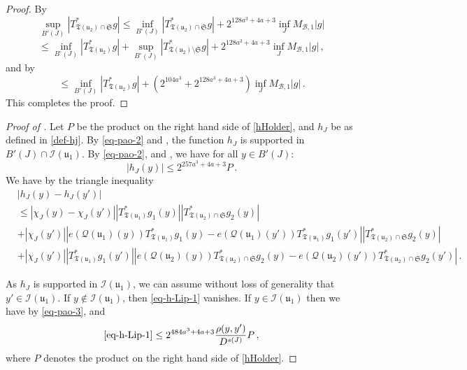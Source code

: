 \documentclass[10pt,a4paper]{article}
\theoremstyle{plain}
\theoremstyle{definition}
\numberwithin{equation}{subsection}
\newcommand{\fu}{{\mathfrak u}}
\newcommand{\fT}{{\mathfrak T}}
\newcommand{\scI}{{\mathcal{I}}} %
\newcommand{\fcc}{{\mathcal{Q}}}
\newcommand{\proves}[1]{}
\newcommand{\leanok}{}
\begin{document}
    \begin{proof}
        \leanok
        By 
        $$
            \sup_{B'(J)} |T^*_{\fT(\fu_2) \cap \mathfrak{S}} g| \le \inf_{B^\circ{}(J)} |T_{\fT(\fu_2) \cap \mathfrak{S}}^* g| + 2^{128a^3+4a+3} \inf_{J} M_{\mathcal{B}, 1} |g|
        $$
        $$
            \le \inf_{B^\circ{}(J)} |T_{\fT(\fu_2)}^* g| + \sup_{B^\circ{}(J)} |T_{\fT(\fu_2) \setminus \mathfrak{S}}^* g| + 2^{128a^3+4a+3} \inf_{J} M_{\mathcal{B}, 1} |g|\,,
        $$
        and by 
        $$
            \le \inf_{B^\circ{}(J)} |T_{\fT(\fu_2)}^* g| + (2^{104a^3} + 2^{128a^3+4a+3}) \inf_{J} M_{\mathcal{B}, 1} |g|\,.
        $$
        This completes the proof.
    \end{proof}

    \begin{proof}[Proof of ]
        \leanok
        \proves{Holder-correlation-tree}
        Let $P$ be the product on the right hand side of \eqref{hHolder}, and $h_J$ be as defined in \eqref{def-hj}.
        By \eqref{eq-pao-2} and , the function $h_J$ is supported in $B'(J) \cap \scI(\fu_1)$.
        By \eqref{eq-pao-2},  and , we have for all $y \in B'(J)$:
        $$
            |h_J(y)| \le 2^{257a^3+4a+3} P\,.
        $$
        We have by the triangle inequality
        \begin{align}
            &|h_J(y) - h_J(y')|\nonumber\\
            \label{eq-h-Lip-1}
            &\le |\chi_J(y) - \chi_J(y')| |T_{\fT(\fu_1)}^* g_1(y)| |T_{\fT(\fu_2) \cap \mathfrak{S}}^* g_2(y)|\\
            \label{eq-h-Lip-2}
            & + |\chi_J(y')| |e(\fcc(\fu_1)(y)) T_{\fT(\fu_1)}^* g_1(y) - e(\fcc(\fu_1)(y')) T_{\fT(\fu_1)}^* g_1(y')| |T_{\fT(\fu_2) \cap \mathfrak{S}}^* g_2(y)|\\
            \label{eq-h-Lip-3}
            & + |\chi_J(y')| |T_{\fT(\fu_1)}^* g_1(y')| |e(\fcc(\fu_2)(y)) T_{\fT(\fu_2) \cap \mathfrak{S}}^* g_2(y) - e(\fcc(\fu_2)(y')) T_{\fT(\fu_2) \cap \mathfrak{S}}^* g_2(y')|\,.
        \end{align}

        As $h_J$ is supported in $\scI(\fu_1)$, we can assume without loss of generality that $y' \in \scI(\fu_1)$.
        If $y \notin \scI(\fu_1)$, then \eqref{eq-h-Lip-1} vanishes. If $y \in \scI(\fu_1)$ then we have by \eqref{eq-pao-3},  and 
        $$
            \eqref{eq-h-Lip-1} \le 2^{484a^3+4a+3} \frac{\rho(y,y')}{D^{s(J)}} P\,,
        $$
        where $P$ denotes the product on the right hand side of \eqref{hHolder}.


\end{proof}
\end{document}
